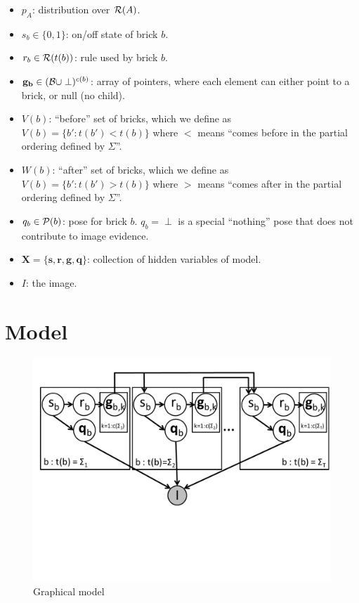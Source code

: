 \documentclass[11pt]{article}
\newcommand{\Pose}{{\cal P}}
\newcommand{\X}{\mathbf{X}}
\newcommand{\symb}{\Sigma}
\begin{document}
\begin{itemize}
\item $p_A$: distribution over ${\cal R}(A)$.

\item $s_b \in \{0,1\}$: on/off state of brick $b$.

\item $r_b \in {\cal R}(t(b))$: rule used by brick $b$.

\item $\mathbf{g_b} \in ( {\cal B} \cup \perp )^{c(b)}$: array of pointers, where each element can either point to a brick, or null (no child).

\item $V(b)$: ``before'' set of bricks, which we define as $V(b) = \{b' : t(b') < t(b) \}$ where $<$ means ``comes before in the partial ordering defined by $\symb$''.

\item $W(b)$: ``after'' set of bricks, which we define as $V(b) = \{b' : t(b') > t(b) \}$ where $>$ means ``comes after in the partial ordering defined by $\symb$''.

\item $q_b \in \Pose(b)$: pose for brick $b$. $q_b = \perp$ is a special ``nothing'' pose that does not contribute to image evidence.

\item $\X = \{ \mathbf{s}, \mathbf{r}, \mathbf{g}, \mathbf{q}\}$: collection of hidden variables of model.

\item $I$: the image.

\end{itemize}

\section{Model}

\begin{figure}[htbp]
\begin{center}
\includegraphics[width=\textwidth, trim=0cm 6cm 0cm 0cm]{gm.pdf}
\caption{Graphical model}
\end{center}
\end{figure}
\end{document}
